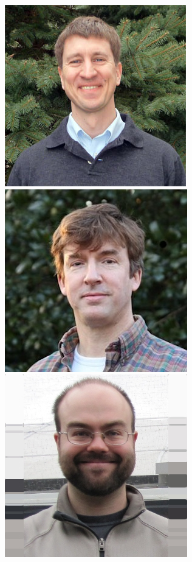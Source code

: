 \documentclass[xcolor=dvipsnames,red]{beamer}
\begin{document}
\begin{frame}
\begin{columns}
\begin{column}{.25\textwidth}
\includegraphics[width=.75\textwidth]{imgs/scott_determan.jpg}\\
\vspace{.2 cm}
\includegraphics[width=.75\textwidth]{imgs/tom_adelman.jpg}\\
\vspace{.2 cm}
\includegraphics[width=.75\textwidth]{imgs/david_richardson.jpg}
\end{column}


\end{columns}
\end{frame}
\end{document}
